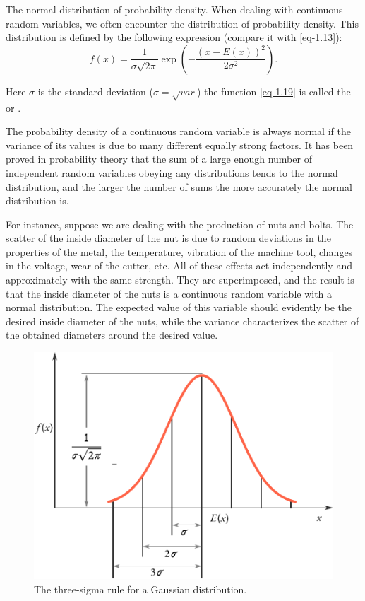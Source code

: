 The normal distribution of probability density. When dealing with
continuous random variables, we often encounter the 
distribution of probability density. This distribution is defined by the
following expression (compare it with \eqref{eq-1.13}):
\begin{equation}
f(x) = \frac{1}{\sigma \sqrt{2 \pi}} \exp \left( - \frac{(x - E(x))^2}{2 \sigma ^{2}}\right).
\label{eq-1.19}
\end{equation}

Here $\sigma$ is the standard deviation ($\sigma = \sqrt{var}$) the
function \eqref{eq-1.19} is called the  or .

The probability density of a continuous random variable is always
normal if the variance of its values is due to many different equally
strong factors. It has been proved in probability theory that the sum of
a large enough number of independent random variables obeying any
distributions tends to the normal distribution, and the larger the number
of sums the more accurately the normal distribution is.



For instance, suppose we are dealing with the production of nuts and
bolts. The scatter of the inside diameter of the nut is due to random
deviations in the properties of the metal, the temperature, vibration of
the machine tool, changes in the voltage, wear of the cutter, etc. All of
these effects act independently and approximately with the same
strength. They are superimposed, and the result is that the inside
diameter of the nuts is a continuous random variable with a normal
distribution. The expected value of this variable should evidently be the
desired inside diameter of the nuts, while the variance characterizes the
scatter of the obtained diameters around the desired value.


\begin{figure}[!ht]
 \centering
 \includegraphics[width=0.75\tfwidth]{figures/three-sigma.pdf}
\caption{The three-sigma rule for a Gaussian distribution.\label{three-sigma}}
 \end{figure}




